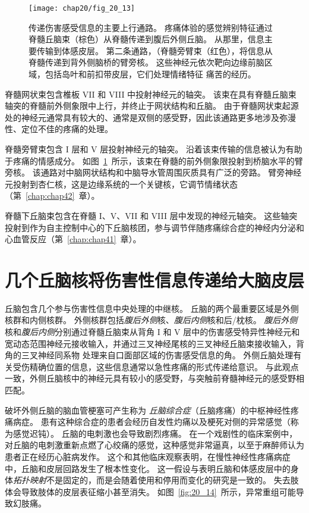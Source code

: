 \begin{figure}[htbp]
	\centering
	\texttt{[image: chap20/fig\_20\_13]}
	\caption{传递伤害感受信息的主要上行通路。
		疼痛体验的感觉辨别特征通过脊髓丘脑束（棕色）从脊髓传递到腹后外侧丘脑。
		从那里，信息主要传输到体感皮层。
		第二条通路，（脊髓旁臂束（红色），将信息从脊髓传递到背外侧脑桥的臂旁核。
		这些神经元依次靶向边缘前脑区域，包括岛叶和前扣带皮层，它们处理情绪特征 痛苦的经历。}
	\label{fig:20_13}
\end{figure}


脊髓网状束包含椎板 VII 和 VIII 中投射神经元的轴突。
该束在具有脊髓丘脑束轴突的脊髓前外侧象限中上行，并终止于网状结构和丘脑。
由于脊髓网状束起源处的神经元通常具有较大的、通常是双侧的感受野，因此该通路更多地涉及弥漫性、定位不佳的疼痛的处理。


脊髓旁臂束包含 I 层和 V 层投射神经元的轴突。
沿着该束传输的信息被认为有助于疼痛的情感成分。
如图~\ref{fig:20_13}~所示，该束在脊髓的前外侧象限投射到桥脑水平的臂旁核。
该通路对中脑网状结构和中脑导水管周围灰质具有广泛的旁路。
臂旁神经元投射到杏仁核，这是边缘系统的一个关键核，它调节情绪状态（第~\ref{chap:chap42}~章）。


脊髓下丘脑束包含在脊髓 I、V、VII 和 VIII 层中发现的神经元轴突。
这些轴突投射到作为自主控制中心的下丘脑核团，参与调节伴随疼痛综合症的神经内分泌和心血管反应（第~\ref{chap:chap41}~章）。



\section{几个丘脑核将伤害性信息传递给大脑皮层}

丘脑包含几个参与伤害性信息中央处理的中继核。
丘脑的两个最重要区域是外侧核群和内侧核群。
外侧核群包括\textit{腹后外侧}核、\textit{腹后内侧}核和后/枕核。
\textit{腹后外侧}核和\textit{腹后内侧}分别通过脊髓丘脑束从背角 I 和 V 层中的伤害感受特异性神经元和宽动态范围神经元接收输入，并通过三叉神经尾核的三叉神经丘脑束接收输入，背角的三叉神经同系物 处理来自口面部区域的伤害感受信息的角。
外侧丘脑处理有关受伤精确位置的信息，这些信息通常以急性疼痛的形式传递给意识。
与此观点一致，外侧丘脑核中的神经元具有较小的感受野，与突触前脊髓神经元的感受野相匹配。


破坏外侧丘脑的脑血管梗塞可产生称为 \textit{丘脑综合症}（丘脑疼痛）的中枢神经性疼痛病症。
患有这种综合症的患者会经历自发性灼痛以及梗死对侧的异常感觉（称为感觉迟钝）。
丘脑的电刺激也会导致剧烈疼痛。
在一个戏剧性的临床案例中，对丘脑的电刺激重新点燃了心绞痛的感觉，这种感觉非常逼真，以至于麻醉师认为患者正在经历心脏病发作。
这个和其他临床观察表明，在慢性神经性疼痛病症中，丘脑和皮层回路发生了根本性变化。
这一假设与表明丘脑和体感皮层中的身体\textit{拓扑映射}不是固定的，而是会随着使用和停用而变化的研究是一致的。
失去肢体会导致肢体的皮层表征缩小甚至消失。
如图~\ref{fig:20_14}~所示，异常重组可能导致幻肢痛。



